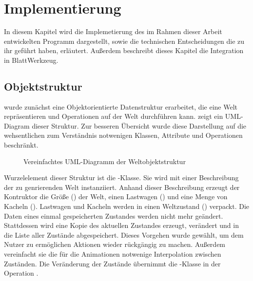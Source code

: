 \chapter{Implementierung}
\label{sec:implementation}

In diesem Kapitel wird die Implemetierung des im Rahmen dieser Arbeit entwickelten Programm dargestellt, sowie die technischen Entscheidungen die zu ihr geführt haben, erläutert. Außerdem beschreibt dieses Kapitel die Integration in BlattWerkzeug.

\section{Objektstruktur}
\label{sec:implementation:structure}

\TODO{} wurde zunächst eine Objektorientierte Datenstruktur erarbeitet, die eine Welt repräsentieren und Operationen auf der Welt durchführen kann.  zeigt ein UML-Diagram dieser Struktur. Zur besseren Übersicht wurde diese Darstellung auf die wehsentlichen zum Verständnis notwenigen Klassen, Attribute und Operationen beschränkt.

\begin{figure}
  
  \caption{Vereinfachtes UML-Diagramm der Weltobjektstruktur}
  \label{fig:implementation:structure:uml}
\end{figure}

Wurzelelement dieser Struktur ist die -Klasse. Sie wird mit einer Beschreibung der zu genrierenden Welt instanziiert. Anhand dieser Beschreibung erzeugt der Kontruktor die Größe () der Welt, einen Lastwagen () und eine Menge von Kacheln (). Lastwagen und Kacheln werden in einen Weltzustand () verpackt. Die Daten eines einmal gespeicherten Zustandes werden nicht mehr geändert. Stattdessen wird eine Kopie des aktuellen Zustandes erzeugt, verändert und in die Liste aller Zustände abgespeichert. Dieses Vorgehen wurde gewählt, um dem Nutzer zu ermöglichen Aktionen wieder rückgängig zu machen. Außerdem vereinfacht sie die für die Animationen  notwenige Interpolation zwischen Zuständen. Die Veränderung der Zustände übernimmt die -Klasse in der Operation .

